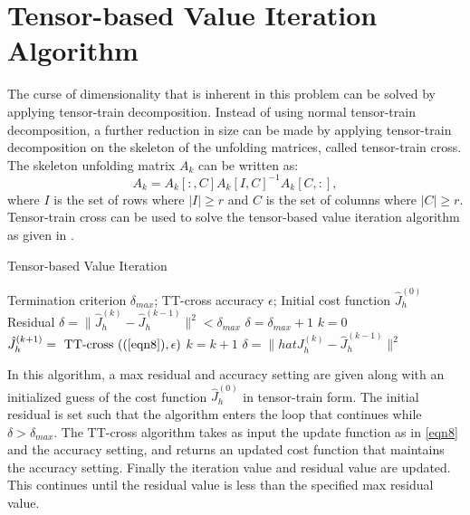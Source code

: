 \section{Tensor-based Value Iteration Algorithm}

The curse of dimensionality that is inherent in this problem can be solved by applying tensor-train decomposition. Instead of using normal tensor-train decomposition, a further reduction in size can be made by applying tensor-train decomposition on the skeleton of the unfolding matrices, called tensor-train cross. The skeleton unfolding matrix $A_k$ can be written as:
\begin{equation*}
A_k = A_k[:,C]A_k[I,C]^{-1}A_k[C,:],
\end{equation*}
where $I$ is the set of rows where $|I| \geq r$ and $C$ is the set of columns where $|C| \geq r$. Tensor-train cross can be used to solve the tensor-based value iteration algorithm as given in .
\begin{algorithm}
\caption{Tensor-based Value Iteration \cite{Gorod}}\label{TVIalg}
\begin{algorithmic}[1]
	\Require Termination criterion $\delta_{max}$; TT-cross accuracy $\epsilon$; Initial cost function $\hat{J}_h^{(0)}$
	\Ensure Residual $\delta=\|\hat{J}_h^{(k)}-\hat{J}_h^{(k-1)}\|^2<\delta_{max}$
	\State $\delta = \delta_{max} + 1$
	\State $k = 0$
	 \do{}
		\State $\hat{J}_h^{(k+1)} = \textnormal{ TT-cross }((\ref{eqn8}),\epsilon)$
		\State $k = k+1$
		\State $\delta = \|hat{J}_h^{(k)}-\hat{J}_h^{(k-1)}\|^2$
	\EndWhile
\end{algorithmic}
\end{algorithm}

In this algorithm, a max residual and accuracy setting are given along with an initialized guess of the cost function $\hat{J}_h^{(0)}$ in tensor-train form. The initial residual is set such that the algorithm enters the loop that continues while $\delta > \delta_{max}$. The TT-cross algorithm takes as input the update function as in \ref{eqn8} and the accuracy setting, and returns an updated cost function that maintains the accuracy setting. Finally the iteration value and residual value are updated. This continues until the residual value is less than the specified max residual value. 

